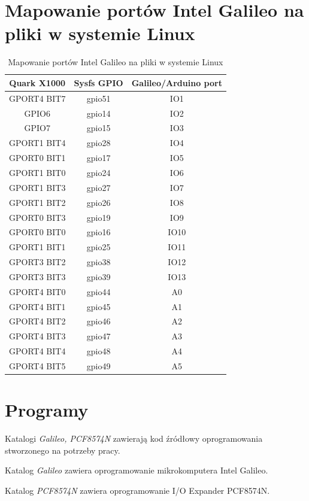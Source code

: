 \documentclass{xmgr}
\begin{document}
\chapter{Mapowanie portów Intel Galileo na pliki w systemie Linux}
\begin{table}[!hp]
\begin{tabular}{|c|c|c|} \hline
\textbf{Quark X1000} & \textbf{Sysfs GPIO} & \textbf{Galileo/Arduino port} \\ \hline
GPORT4 BIT7 & gpio51 & IO1 \\ \hline
GPIO6 & gpio14 & IO2 \\ \hline
GPIO7 & gpio15 & IO3 \\ \hline
GPORT1 BIT4 & gpio28 & IO4 \\ \hline
GPORT0 BIT1 & gpio17 & IO5 \\ \hline
GPORT1 BIT0 & gpio24 & IO6 \\ \hline
GPORT1 BIT3 & gpio27 & IO7 \\ \hline
GPORT1 BIT2 & gpio26 & IO8 \\ \hline
GPORT0 BIT3 & gpio19 & IO9 \\ \hline
GPORT0 BIT0 & gpio16 & IO10 \\ \hline
GPORT1 BIT1 & gpio25 & IO11 \\ \hline
GPORT3 BIT2 & gpio38 & IO12 \\ \hline
GPORT3 BIT3 & gpio39 & IO13 \\ \hline
GPORT4 BIT0 & gpio44 & A0 \\ \hline
GPORT4 BIT1 & gpio45 & A1 \\ \hline
GPORT4 BIT2 & gpio46 & A2 \\ \hline
GPORT4 BIT3 & gpio47 & A3 \\ \hline
GPORT4 BIT4 & gpio48 & A4 \\ \hline
GPORT4 BIT5 & gpio49 & A5 \\ \hline
\end{tabular}
\caption{Mapowanie portów Intel Galileo na pliki w systemie Linux}
\end{table}

\chapter{Programy}
Katalogi \emph{Galileo, PCF8574N} zawierają kod źródłowy oprogramowania stworzonego na potrzeby pracy. 

\noindent Katalog \emph{Galileo} zawiera oprogramowanie mikrokomputera Intel Galileo.

\noindent Katalog \emph{PCF8574N} zawiera oprogramowanie I/O Expander PCF8574N.




\listoftables

\listoffigures

\oswiadczenie
\end{document}
